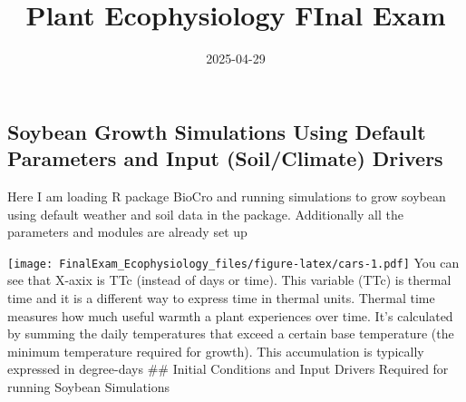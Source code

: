 \documentclass[
]{article}
\title{Plant Ecophysiology FInal Exam}
\author{}
\date{\vspace{-2.5em}2025-04-29}
\newenvironment{Shaded}{\begin{snugshade}}{\end{snugshade}}
\newcommand{\AttributeTok}[1]{\textcolor[rgb]{0.13,0.29,0.53}{#1}}
\newcommand{\ConstantTok}[1]{\textcolor[rgb]{0.56,0.35,0.01}{#1}}
\newcommand{\FunctionTok}[1]{\textcolor[rgb]{0.13,0.29,0.53}{\textbf{#1}}}
\newcommand{\NormalTok}[1]{#1}
\newcommand{\OtherTok}[1]{\textcolor[rgb]{0.56,0.35,0.01}{#1}}
\newcommand{\SpecialCharTok}[1]{\textcolor[rgb]{0.81,0.36,0.00}{\textbf{#1}}}
\newcommand{\StringTok}[1]{\textcolor[rgb]{0.31,0.60,0.02}{#1}}
\begin{document}
\maketitle

\subsection{Soybean Growth Simulations Using Default Parameters and
Input (Soil/Climate)
Drivers}\label{soybean-growth-simulations-using-default-parameters-and-input-soilclimate-drivers}

Here I am loading R package BioCro and running simulations to grow
soybean using default weather and soil data in the package. Additionally
all the parameters and modules are already set up

\begin{Shaded}
\end{Shaded}

\texttt{[image: FinalExam\_Ecophysiology\_files/figure-latex/cars-1.pdf]}
You can see that X-axix is TTc (instead of days or time). This variable
(TTc) is thermal time and it is a different way to express time in
thermal units. Thermal time measures how much useful warmth a plant
experiences over time. It's calculated by summing the daily temperatures
that exceed a certain base temperature (the minimum temperature required
for growth). This accumulation is typically expressed in degree-days
\#\# Initial Conditions and Input Drivers Required for running Soybean
Simulations
\end{document}
